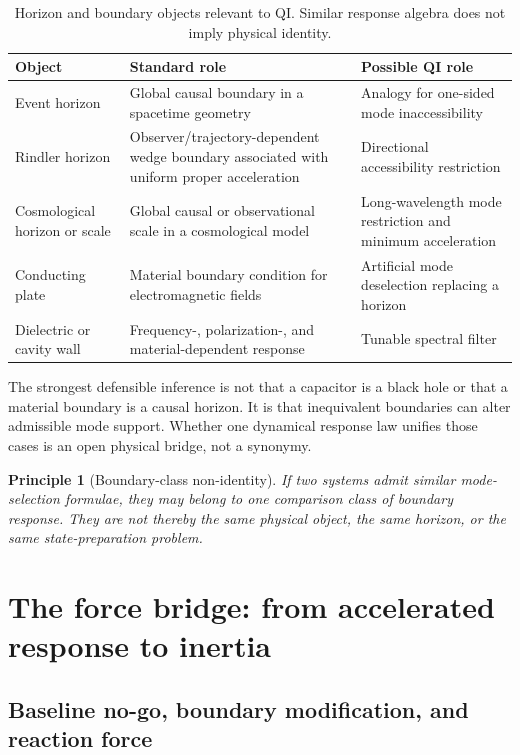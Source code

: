 \documentclass[11pt]{article}
\newtheorem{principle}{Principle}
\begin{document}
\begin{table}[H]
\centering
\caption{Horizon and boundary objects relevant to QI. Similar response algebra does not imply physical identity.}
\label{tab:horizon_taxonomy}
\begin{tabularx}{\textwidth}{>{\raggedright\arraybackslash}p{}>{\raggedright\arraybackslash}p{}X}
\toprule
Object & Standard role & Possible QI role \\
\midrule
Event horizon & Global causal boundary in a spacetime geometry & Analogy for one-sided mode inaccessibility \\
Rindler horizon & Observer/trajectory-dependent wedge boundary associated with uniform proper acceleration & Directional accessibility restriction \\
Cosmological horizon or scale & Global causal or observational scale in a cosmological model & Long-wavelength mode restriction and minimum acceleration \\
Conducting plate & Material boundary condition for electromagnetic fields & Artificial mode deselection replacing a horizon \\
Dielectric or cavity wall & Frequency-, polarization-, and material-dependent response & Tunable spectral filter \\
\bottomrule
\end{tabularx}
\end{table}

The strongest defensible inference is not that a capacitor is a black hole or that a material boundary is a causal horizon. It is that inequivalent boundaries can alter admissible mode support. Whether one dynamical response law unifies those cases is an open physical bridge, not a synonymy.

\begin{principle}[Boundary-class non-identity]
If two systems admit similar mode-selection formulae, they may belong to one comparison class of boundary response. They are not thereby the same physical object, the same horizon, or the same state-preparation problem.
\end{principle}

\section{The force bridge: from accelerated response to inertia}
\label{sec:force_bridge}

\subsection{Baseline no-go, boundary modification, and reaction force}
\end{document}
